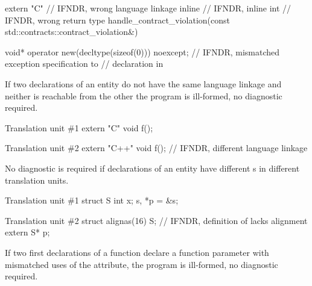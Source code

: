 \pnum
\begin{example}
\begin{codeblock}
extern "C"  // IFNDR, wrong language linkage
inline      // IFNDR, inline
int         // IFNDR, wrong return type
handle_contract_violation(const std::contracts::contract_violation&) {}

void* operator new(decltype(sizeof(0))) noexcept;   // IFNDR, mismatched exception specification to
                                                    // declaration in 
\end{codeblock}
\end{example}


\pnum
If two declarations of an entity
do not have the same language linkage
and neither is reachable from the other
the program is ill-formed, no diagnostic required.

\pnum
\begin{example}
\begin{codeblocktu}{Translation unit \#1}
extern "C" { void f(); }
\end{codeblocktu}
\begin{codeblocktu}{Translation unit \#2}
extern "C++" { void f(); }  // IFNDR, different language linkage
\end{codeblocktu}
\end{example}


\pnum
No diagnostic is required if declarations of an entity have different s in different
translation units.

\pnum
\begin{example}
\begin{codeblocktu}{Translation unit \#1}
struct S { int x; } s, *p = &s;
\end{codeblocktu}
\begin{codeblocktu}{Translation unit \#2}
struct alignas(16) S;   // IFNDR, definition of  lacks alignment
extern S* p;
\end{codeblocktu}
\end{example}


\pnum
If two first declarations of a function
declare a function parameter with
mismatched uses of the  attribute,
the program is ill-formed, no diagnostic required.

